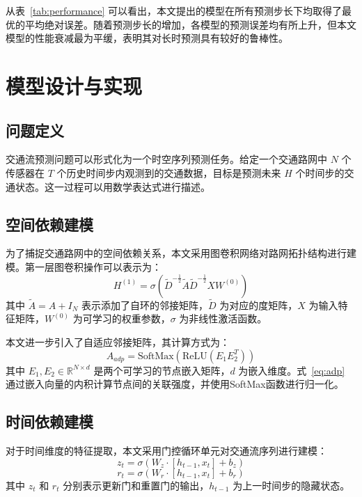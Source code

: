 \documentclass[12pt,a4paper,twoside]{ctexbook}
\begin{document}
从表~\ref{tab:performance} 可以看出，本文提出的模型在所有预测步长下均取得了最优的平均绝对误差。随着预测步长的增加，各模型的预测误差均有所上升，但本文模型的性能衰减最为平缓，表明其对长时预测具有较好的鲁棒性。

\chapter{模型设计与实现}
\section{问题定义}
交通流预测问题可以形式化为一个时空序列预测任务。给定一个交通路网中 $N$ 个传感器在 $T$ 个历史时间步内观测到的交通数据，目标是预测未来 $H$ 个时间步的交通状态。这一过程可以用数学表达式进行描述。

\section{空间依赖建模}
为了捕捉交通路网中的空间依赖关系，本文采用图卷积网络对路网拓扑结构进行建模。第一层图卷积操作可以表示为：
\begin{equation}
H^{(1)} = \sigma\left(\tilde{D}^{-\frac{1}{2}} \tilde{A} \tilde{D}^{-\frac{1}{2}} X W^{(0)}\right)
\label{eq:gcn1}
\end{equation}
其中 $\tilde{A} = A + I_N$ 表示添加了自环的邻接矩阵，$\tilde{D}$ 为对应的度矩阵，$X$ 为输入特征矩阵，$W^{(0)}$ 为可学习的权重参数，$\sigma$ 为非线性激活函数。

本文进一步引入了自适应邻接矩阵，其计算方式为：
\begin{equation}
A_{adp} = \text{SoftMax}\left(\text{ReLU}(E_1 E_2^T)\right)
\label{eq:adp}
\end{equation}
其中 $E_1, E_2 \in \mathbb{R}^{N \times d}$ 是两个可学习的节点嵌入矩阵，$d$ 为嵌入维度。式~\eqref{eq:adp} 通过嵌入向量的内积计算节点间的关联强度，并使用SoftMax函数进行归一化。

\section{时间依赖建模}
对于时间维度的特征提取，本文采用门控循环单元对交通流序列进行建模：
\begin{equation}
z_t = \sigma\left(W_z \cdot [h_{t-1}, x_t] + b_z\right)
\label{eq:gru_z}
\end{equation}
\begin{equation}
r_t = \sigma\left(W_r \cdot [h_{t-1}, x_t] + b_r\right)
\label{eq:gru_r}
\end{equation}
其中 $z_t$ 和 $r_t$ 分别表示更新门和重置门的输出，$h_{t-1}$ 为上一时间步的隐藏状态。
\end{document}

